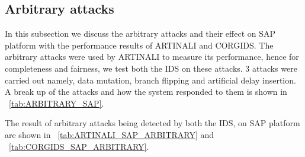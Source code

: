 \subsection{Arbitrary attacks}
In this subsection we discuss the arbitrary attacks and their effect on \ac{SAP} platform with the performance results of ARTINALI and \ac{CORGIDS}. The arbitrary attacks were used by ARTINALI to measure its performance, hence for completeness and fairness, we test both the \ac{IDS} on these attacks. 3 attacks were carried out namely, data mutation, branch flipping and artificial delay insertion. A break up of the attacks and how the system responded to them is shown in ~\autoref{tab:ARBITRARY_SAP}.

\begin{table}
\centering
  \caption{Arbitrary attacks on \ac{SAP} platform and its response}
  \label{tab:ARBITRARY_SAP}
\end{table}

The result of arbitrary attacks being detected by both the \ac{IDS}, on \ac{SAP} platform are shown in ~\autoref{tab:ARTINALI_SAP_ARBITRARY} and ~\autoref{tab:CORGIDS_SAP_ARBITRARY}.

\begin{table}
\centering
  \caption{Results of intrusion detection by ARTINALI for Arbitrary attacks on \ac{SAP} platform}
  \label{tab:ARTINALI_SAP_ARBITRARY}
\end{table}


